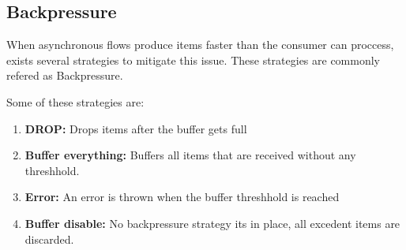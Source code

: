 	\subsection{Backpressure} 
	When asynchronous flows produce  items faster than the consumer can proccess, exists several strategies to mitigate this issue. These strategies are commonly refered as Backpressure.

	Some of these strategies are:
	\begin{enumerate}
		\item \textbf{DROP:} Drops items after the buffer gets full
		\item \textbf{Buffer everything:} Buffers all items that are received without any threshhold.
		\item \textbf{Error:} An error is thrown when the buffer threshhold is reached
		\item \textbf{Buffer disable:} No backpressure strategy its in place, all excedent items are discarded.
	\end{enumerate}
	\clearpage
